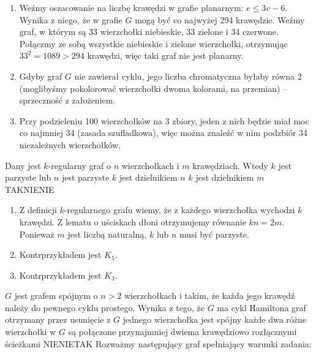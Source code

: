 \begin{solutions}
    \begin{enumerate}[\bf A.]
        \item Weźmy oszacowanie na liczbę krawędzi w grafie planarnym: $e \leq 3v-6$. Wynika z niego, że w grafie $G$ mogą być co najwyżej 294 krawędzie. Weźmy graf, w którym są 33 wierzchołki niebieskie, 33 zielone i 34 czerwone. Połączmy ze sobą wszystkie niebieskie i zielone wierzchołki, otrzymując $33^2 = 1089 > 294$ krawędzi, więc taki graf nie jest planarny.

        \item Gdyby graf $G$ nie zawierał cyklu, jego liczba chromatyczna byłaby równa 2 (moglibyśmy pokolorować wierzchołki dwoma kolorami, na przemian) -- sprzeczność z założeniem.

        \item Przy podzieleniu 100 wierzchołków na 3 zbiory, jeden z nich będzie miał moc co najmniej 34 (zasada szufladkowa), więc można znaleźć w nim podzbiór 34 niezależnych wierzchołków.
    \end{enumerate}
    
    \sol Dany jest $k$-regularny graf o $n$ wierzchołkach i $m$ krawędziach. Wtedy
    \answerss
    {$k$ jest parzyste lub $n$ jest parzyste}
    {$k$ jest dzielnikiem $n$}
    {$k$ jest dzielnikiem $m$}
    {TAK}{NIE}{NIE}

    \begin{enumerate}[\bf A.]
        \item Z definicji $k$-regularnego grafu wiemy, że z każdego wierzchołka wychodzi $k$ krawędzi. Z lematu o uściskach dłoni otrzymujemy równanie $kn = 2m$. Ponieważ $m$ jest liczbą naturalną, $k$ lub $n$ musi być parzyste.
        \item Kontrprzykładem jest $K_5$.
        \item Kontrprzykładem jest $K_3$.
    \end{enumerate}

    \sol $G$ jest grafem spójnym o $n > 2$ wierzchołkach i takim, że każda jego krawędź należy do pewnego cyklu prostego. Wynika z tego, że
    \answerss
    {$G$ ma cykl Hamiltona}
    {graf otrzymany przez usunięcie z $G$ jednego wierzchołka jest spójny}
    {każde dwa różne wierzchołki w $G$ są połączone przynajmniej dwiema krawędziowo rozłącznymi ścieżkami}
    {NIE}{NIE}{TAK}
    Rozważmy następujący graf spełniający warunki zadania:
    \begin{center}
\end{center}
\end{solutions}
